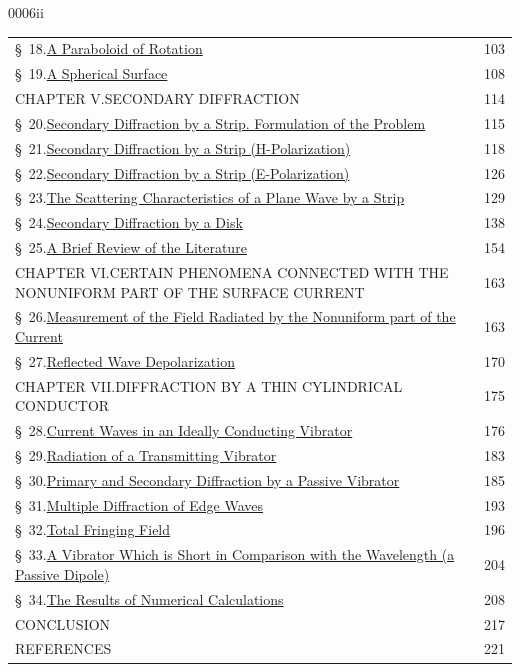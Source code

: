 \begin{scanpage}{0006}{ii}
\noindent\begin{tabular}{@{}p{.89\linewidth}r@{}}
\quad\S\ 18.\quad\uline{A Paraboloid of Rotation}&103\\
\quad\S\ 19.\quad\uline{A Spherical Surface}&108\\[8pt]
CHAPTER V.\quad SECONDARY DIFFRACTION&114\\
\quad\S\ 20.\quad\uline{Secondary Diffraction by a Strip. Formulation of the Problem}&115\\
\quad\S\ 21.\quad\uline{Secondary Diffraction by a Strip (H-Polarization)}&118\\
\quad\S\ 22.\quad\uline{Secondary Diffraction by a Strip (E-Polarization)}&126\\
\quad\S\ 23.\quad\uline{The Scattering Characteristics of a Plane Wave by a Strip}&129\\
\quad\S\ 24.\quad\uline{Secondary Diffraction by a Disk}&138\\
\quad\S\ 25.\quad\uline{A Brief Review of the Literature}&154\\[8pt]
CHAPTER VI.\quad CERTAIN PHENOMENA CONNECTED WITH THE NONUNIFORM PART OF THE SURFACE CURRENT&163\\
\quad\S\ 26.\quad\uline{Measurement of the Field Radiated by the Nonuniform part of the Current}&163\\
\quad\S\ 27.\quad\uline{Reflected Wave Depolarization}&170\\[8pt]
CHAPTER VII.\quad DIFFRACTION BY A THIN CYLINDRICAL CONDUCTOR&175\\
\quad\S\ 28.\quad\uline{Current Waves in an Ideally Conducting Vibrator}&176\\
\quad\S\ 29.\quad\uline{Radiation of a Transmitting Vibrator}&183\\
\quad\S\ 30.\quad\uline{Primary and Secondary Diffraction by a Passive Vibrator}&185\\
\quad\S\ 31.\quad\uline{Multiple Diffraction of Edge Waves}&193\\
\quad\S\ 32.\quad\uline{Total Fringing Field}&196\\
\quad\S\ 33.\quad\uline{A Vibrator Which is Short in Comparison with the Wavelength (a Passive Dipole)}&204\\
\quad\S\ 34.\quad\uline{The Results of Numerical Calculations}&208\\[8pt]
CONCLUSION&217\\[8pt]
REFERENCES&221
\end{tabular}
\end{scanpage}
